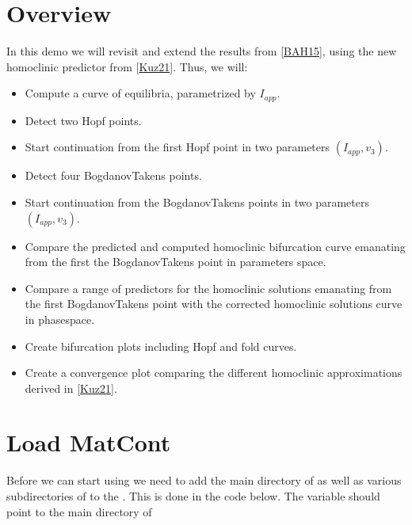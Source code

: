 \documentclass[letterpaper,10pt,english]{jupyterBook}
\begin{document}
\section{Overview}
\label{\detokenize{Morris-Lecar:overview}}
\sphinxAtStartPar
In this demo we will revisit and extend the results from {[}\hyperlink{cite.references:id5}{BAH15}{]},
using the new homoclinic predictor from {[}\hyperlink{cite.references:id3}{Kuz21}{]}. Thus, we will:
\begin{itemize}
\item {} 
\sphinxAtStartPar
Compute a curve of equilibria, parametrized by \(I_{app}\).

\item {} 
\sphinxAtStartPar
Detect two Hopf points.

\item {} 
\sphinxAtStartPar
Start continuation from the first Hopf point in two parameters \((I_{app},v_3)\).

\item {} 
\sphinxAtStartPar
Detect four Bogdanov\sphinxhyphen{}Takens points.

\item {} 
\sphinxAtStartPar
Start continuation from the Bogdanov\sphinxhyphen{}Takens points in two parameters \((I_{app},v_3)\).

\item {} 
\sphinxAtStartPar
Compare the predicted and computed homoclinic bifurcation curve emanating
from the first the Bogdanov\sphinxhyphen{}Takens point in parameters space.

\item {} 
\sphinxAtStartPar
Compare a range of predictors for the homoclinic solutions emanating from the
first Bogdanov\sphinxhyphen{}Takens point with the corrected homoclinic solutions curve in
phase\sphinxhyphen{}space.

\item {} 
\sphinxAtStartPar
Create bifurcation plots including Hopf and fold curves.

\item {} 
\sphinxAtStartPar
Create a convergence plot comparing the different homoclinic approximations
derived in {[}\hyperlink{cite.references:id3}{Kuz21}{]}.

\end{itemize}


\section{Load MatCont}
\label{\detokenize{Morris-Lecar:load-matcont}}
\sphinxAtStartPar
Before we can start using  we need to add the main directory of
 as well as various subdirectories of  to the . This is done in the code below. The variable 
should point to the main directory of 
\end{document}
